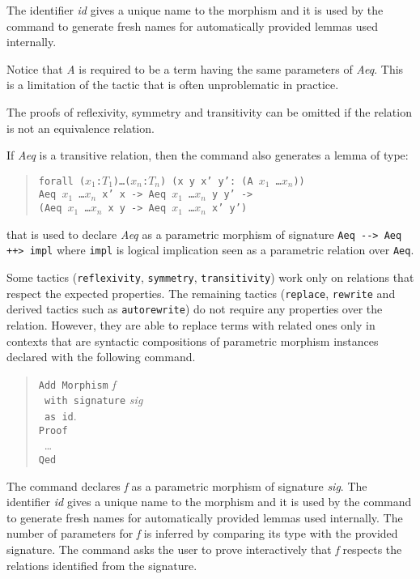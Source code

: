 The identifier \textit{id} gives a unique name to the morphism and it is
used by the command to generate fresh names for automatically provided lemmas
used internally.

Notice that \textit{A} is required to be a term having the same parameters
of \textit{Aeq}. This is a limitation of the tactic that is often unproblematic
in practice.

The proofs of reflexivity, symmetry and transitivity can be omitted if the
relation is not an equivalence relation.

If \textit{Aeq} is a transitive relation, then the command also generates
a lemma of type:
\begin{quote}
\texttt{forall ($x_1$:$T_1$)\ldots($x_n$:$T_n$)
 (x y x' y': (A $x_1$ \ldots $x_n$))\\
  Aeq $x_1$ \ldots $x_n$ x' x -> Aeq $x_1$ \ldots $x_n$ y y' ->\\
  (Aeq $x_1$ \ldots $x_n$ x y -> Aeq $x_1$ \ldots $x_n$ x' y')}
\end{quote}
that is used to declare \textit{Aeq} as a parametric morphism of signature
\texttt{Aeq -{}-> Aeq ++> impl} where \texttt{impl} is logical implication
seen as a parametric relation over \texttt{Aeq}.

Some tactics
(\texttt{reflexivity}, \texttt{symmetry}, \texttt{transitivity}) work only
on relations that respect the expected properties. The remaining tactics
(\texttt{replace}, \texttt{rewrite} and derived tactics such as
\texttt{autorewrite}) do not require any properties over the relation.
However, they are able to replace terms with related ones only in contexts
that are syntactic compositions of parametric morphism instances declared with
the following command.

\begin{quote}
  \texttt{Add Morphism} \textit{f}\\
  \texttt{~with signature} \textit{sig}\\
  \texttt{~as id}.\\
  \texttt{Proof}\\
  ~\ldots\\
  \texttt{Qed}
\end{quote}

The command declares \textit{f} as a parametric morphism of signature
\textit{sig}. The identifier \textit{id} gives a unique name to the morphism
and it is used by the command to generate fresh names for automatically
provided lemmas used internally. The number of parameters for \textit{f}
is inferred by comparing its type with the provided signature.
The command asks the user to prove interactively that \textit{f} respects
the relations identified from the signature.

